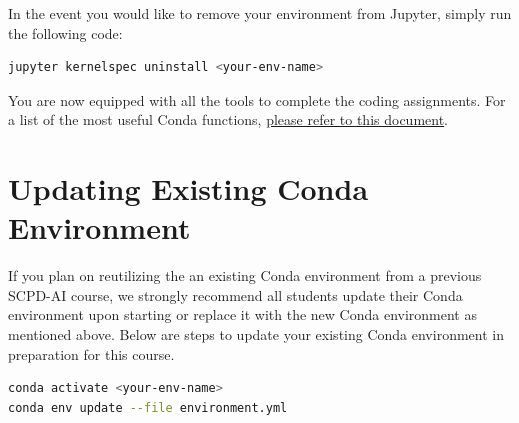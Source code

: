 \documentclass{article}
\begin{document}
In the event you would like to remove your environment from Jupyter, simply run the following code:
\begin{lstlisting}[language=bash]
jupyter kernelspec uninstall <your-env-name>
\end{lstlisting}

You are now equipped with all the tools to complete the coding assignments. For a list of the most useful Conda functions, \href{https://docs.conda.io/projects/conda/en/latest/_downloads/843d9e0198f2a193a3484886fa28163c/conda-cheatsheet.pdf}{please refer to this document}. 

\section{Updating Existing Conda Environment}
 If you plan on reutilizing the an existing Conda environment from a previous SCPD-AI course, we strongly recommend all students update their Conda environment upon starting or replace it with the new Conda environment as mentioned above. Below are steps to update your existing Conda environment in preparation for this course. 

\begin{lstlisting}[language=bash]
conda activate <your-env-name>
conda env update --file environment.yml 
\end{lstlisting}
 
\end{document}
